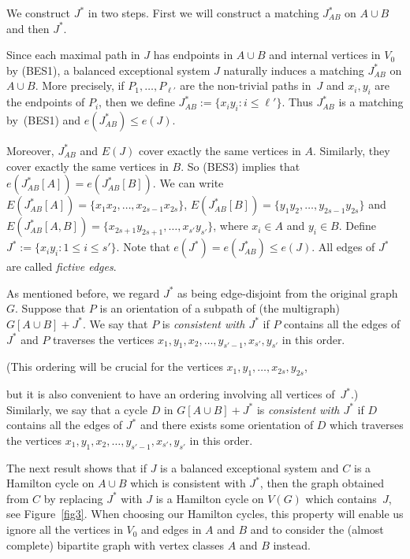 \documentclass{memo-l}
\def\COMMENT#1{}
\numberwithin{section}{chapter}
\numberwithin{equation}{section}
\numberwithin{firstthm}{section}
\numberwithin{figure}{section}
\begin{document}
{We construct $J^{*}$ in two steps.
First we will construct a matching $J^*_{AB}$ on $A \cup B$
and then $J^{*}.$%
	   \COMMENT{AL: I have rephrased the definition/construction of $J^*$. $J^*$ is still the same as before. The construction is similar to the two cliques case.  This is from paper 4.}
Since each maximal path in $J$ has endpoints in $A \cup B$ and internal vertices in $V_0$ by (BES1), a balanced exceptional system $J$ naturally induces a matching $J^*_{AB}$ on $A \cup B$.
More precisely, if $P_1, \dots ,P_{\ell'}$ are the non-trivial paths in~$J$ and $x_i, y_i$ are the endpoints of $P_i$, then we define $J^*_{AB} := \{x_iy_i : i  \le \ell'\}$. 
Thus $J^*_{AB}$ is a matching by~(BES1) and $e(J^*_{AB}) \le e(J)$.%
    \COMMENT{Daniela deleted " by~(BES4)"}
Moreover, $J^*_{AB}$ and $E(J)$ cover exactly the same vertices in $A$. 
Similarly, they cover exactly the same vertices in $B$. 
So (BES3) implies that $e(J^*_{AB}[A])=e(J^*_{AB}[B])$.
We can write $E(J^*_{AB}[A])=\{x_1x_2, \dots, x_{2s-1}x_{2s}\}$,
$E(J^*_{AB}[B])=\{y_1y_2, \dots, y_{2s-1}y_{2s}\}$ and $E(J^*_{AB}[A,B])=\{x_{2s+1}y_{2s+1}, \dots, x_{s'}y_{s'}\}$, where $x_i \in A$ and $y_i \in B$.
Define $J^*:= \{ x_iy_i : 1 \le i \le s' \}$.
Note that $	e(J^*) =  e(J^*_{AB}) \le e(J)$.
All edges of $J^*$ are called \emph{fictive edges}.

As mentioned before, we regard $J^*$ as being edge-disjoint from the original graph~$G$. 
Suppose that $P$ is an orientation of a subpath of (the multigraph) $G[A\cup B]+J^*$. 
We say that $P$ is \emph{consistent with $J^{*}$} if $P$ contains all the edges of $J^{*}$
and $P$ traverses the vertices $x_1,y_1,x_2,\dots,y_{s'-1},x_{s'},y_{s'}$ in this order.%
     \COMMENT{we need to prescribe a vertex rather than an edge ordering as it is important in the next lemma}
(This ordering will be crucial for the vertices $x_1,y_1,\dots,x_{2s},y_{2s}$,%
   \COMMENT{Daniela replaced "added in step (BES$^*$1)" by "$x_1y_1,\dots,x_{2s}y_{2s}$". Also defined when a cycle is consistent}
but it is also convenient to have an ordering
involving all vertices of~$J^*$.) 
Similarly, we say that a cycle $D$ in $G[A\cup B]+J^*$ is \emph{consistent with $J^{*}$} if $D$ contains all the edges of $J^{*}$
and there exists some orientation of $D$ which
traverses the vertices $x_1,y_1,x_2,\dots,y_{s'-1},x_{s'},y_{s'}$ in this order.

The next result shows that if $J$ is a balanced exceptional system and $C$ is a Hamilton cycle on
$A \cup B$ which is consistent with $J^*$, then the graph obtained from $C$ by replacing $J^*$
with $J$ is a Hamilton cycle on $V(G)$ which contains~$J$, see Figure~\ref{fig3}.
When choosing our Hamilton cycles, this property will enable us ignore all the vertices in $V_0$ and edges in $A$ and $B$ and to consider
the (almost complete) bipartite graph with vertex classes $A$ and $B$ instead.%
   \COMMENT{Daniela rephrased (ii) and also adjusted the proof to bring it in line with Allan's changed def of BES}

}
\end{document}

